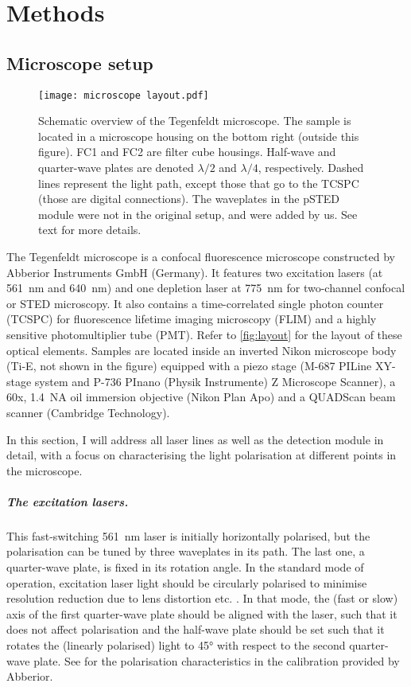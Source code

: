 \chapter{Methods}

\section{Microscope setup}

\begin{figure}
	\centering
	\texttt{[image: microscope layout.pdf]}
	\caption{
		Schematic overview of the Tegenfeldt microscope. The sample is located in a microscope housing on the bottom right (outside this figure). FC1 and FC2 are filter cube housings. Half-wave and quarter-wave plates are denoted $ \lambda/2 $ and $ \lambda/4 $, respectively. Dashed lines represent the light path, except those that go to the TCSPC (those are digital connections). The waveplates in the pSTED module were not in the original setup, and were added by us. See text for more details.
	}
	\label{fig:layout}
\end{figure}

The Tegenfeldt microscope is a confocal fluorescence microscope constructed by Abberior Instruments GmbH (Germany). It features two excitation lasers (at 561~nm and 640~nm) and one depletion laser at 775~nm for two-channel confocal or STED microscopy. It also contains a time-correlated single photon counter (TCSPC) for fluorescence lifetime imaging microscopy (FLIM) and a highly sensitive photomultiplier tube (PMT). Refer to \autoref{fig:layout} for the layout of these optical elements. Samples are located inside an inverted Nikon microscope body (Ti-E, not shown in the figure) equipped with a piezo stage (M-687 PILine XY-stage system and P-736 PInano (Physik Instrumente) Z Microscope Scanner), a 60x, 1.4~NA oil immersion objective (Nikon Plan Apo) and a QUADScan beam scanner (Cambridge Technology).


In this section, I will address all laser lines as well as the detection module in detail, with a focus on characterising the light polarisation at different points in the microscope.

\paragraph{The excitation lasers.} This fast-switching 561~nm laser is initially horizontally polarised, but the polarisation can be tuned by three waveplates in its path. The last one, a quarter-wave plate, is fixed in its rotation angle. In the standard mode of operation, excitation laser light should be circularly polarised to minimise resolution reduction due to lens distortion etc. \cite{Harke2008}. In that mode, the (fast or slow) axis of the first quarter-wave plate should be aligned with the laser, such that it does not affect polarisation and the half-wave plate should be set such that it rotates the (linearly polarised) light to \ang{45} with respect to the second quarter-wave plate. See  for the polarisation characteristics in the calibration provided by Abberior.  

